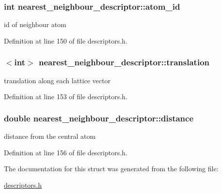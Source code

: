 \subsubsection[{atom\+\_\+id}]{\setlength{\rightskip}{0pt plus 5cm}int nearest\+\_\+neighbour\+\_\+descriptor\+::atom\+\_\+id}\label{structnearest__neighbour__descriptor_a297e5e0ad16ad6dd1393b4ca4967a1b4}


id of neighbour atom 



Definition at line 150 of file descriptors.\+h.

\hypertarget{structnearest__neighbour__descriptor_ac72858701e17806cc6c1c61a5c669cf0}{}
\subsubsection[{translation}]{$<$int$>$ nearest\+\_\+neighbour\+\_\+descriptor\+::translation}\label{structnearest__neighbour__descriptor_ac72858701e17806cc6c1c61a5c669cf0}


translation along each lattice vector 



Definition at line 153 of file descriptors.\+h.

\hypertarget{structnearest__neighbour__descriptor_a43fa51aa108a05b87b18c08e5a1101cf}{}
\subsubsection[{distance}]{\setlength{\rightskip}{0pt plus 5cm}double nearest\+\_\+neighbour\+\_\+descriptor\+::distance}\label{structnearest__neighbour__descriptor_a43fa51aa108a05b87b18c08e5a1101cf}


distance from the central atom 



Definition at line 156 of file descriptors.\+h.



The documentation for this struct was generated from the following file\+:\begin{DoxyCompactItemize}
\item 
\hyperlink{descriptors_8h}{descriptors.\+h}\end{DoxyCompactItemize}
